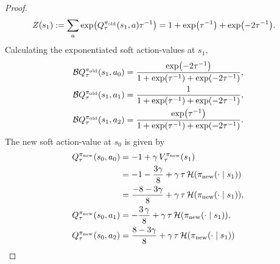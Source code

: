 \documentclass[\main/thesis.tex]{subfiles}
\begin{document}
\begin{proof}
\begin{align*}
    Z(s_1) &:= \sum_a \exp(Q_\tau^{{\pi_\mathrm{old}}}(s_1, a) \tau^{-1}) = 1 + \exp(\tau^{-1}) + \exp(-2\tau^{-1}).
\end{align*}
Calculating the exponentiated soft action-values at $s_1$,
\begin{align*}
    \mathcal{B}Q_\tau^{\pi_\mathrm{old}}(s_1, a_0) &= \frac{\exp(-2\tau^{-1})}{1 + \exp(\tau^{-1}) + \exp(-2\tau^{-1})},\\
    \mathcal{B}Q_\tau^{\pi_\mathrm{old}}(s_1, a_1) &= \frac{1}{1 + \exp(\tau^{-1}) + \exp(-2\tau^{-1})},\\
    \mathcal{B}Q_\tau^{\pi_\mathrm{old}}(s_1, a_2) &= \frac{\exp(\tau^{-1})}{1 + \exp(\tau^{-1}) + \exp(-2\tau^{-1})}.
\end{align*}
The new soft action-value at $s_0$ is given by
\begin{align*}
    Q_\tau^{\pi_\mathrm{new}}(s_0, a_0) &= -1 + \gamma \, V^{\pi_\mathrm{new}}_\tau(s_1) \\
        &= -1 - \frac{3\gamma}{8} + \gamma\, \tau\, \mathcal{H}({\pi_\mathrm{new}}(\cdot \mid s_1)) \\
        &= \frac{-8 - 3 \gamma}{8} + \gamma\, \tau\, \mathcal{H}({\pi_\mathrm{new}}(\cdot \mid s_1)),\\
    Q_\tau^{\pi_\mathrm{new}}(s_0, a_1) &= - \frac{3\, \gamma }{8} + \gamma\, \tau\,\mathcal{H}({\pi_\mathrm{new}}(\cdot \mid s_1)) ,\\
    Q_\tau^{\pi_\mathrm{new}}(s_0, a_2) &= \frac{8 - 3\gamma}{8} + \gamma\, \tau\, \mathcal{H}({\pi_\mathrm{new}}(\cdot \mid s_1))
\end{align*}


\end{proof}
\end{document}
